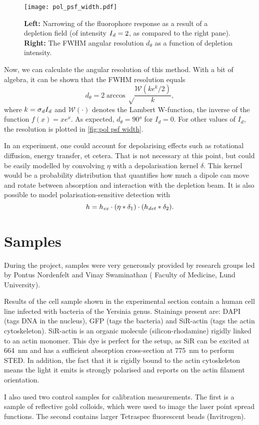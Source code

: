 \begin{figure}
	\centering
	\texttt{[image: pol\_psf\_width.pdf]}
	\caption{
		\textbf{Left:} Narrowing of the fluorophore response as a result of a depletion field (of intensity $ I_{\mathit{d}}=2 $, as compared to the right pane). \textbf{Right:} The FWHM angular resolution $ d_\theta $ as a function of depletion intensity.
	}
	\label{fig:pol psf width}
\end{figure}

Now, we can calculate the angular resolution of this method. With a bit of algebra, it can be shown that the FWHM resolution equals
\begin{equation}
	d_\theta = 2\arccos\sqrt\frac{\mathcal{W}(k e^{k}/2)}{k},
\end{equation}
where $ k = \sigma_{\mathit{d}} I_{\mathit{d}} $ and $ \mathcal{W}(\cdot) $ denotes the Lambert W-function, the inverse of the function $ f(x) = xe^x $. As expected, $ d_\theta=\ang{90} $ for $ I_d=0 $. For other values of $ I_d $, the resolution is plotted in \autoref{fig:pol psf width}.

In an experiment, one could account for depolarising effects such as rotational diffusion, energy transfer, et cetera. That is not necessary at this point, but could be easily modelled by convolving $ \eta $ with a depolarisation kernel $ \delta $. This kernel would be a probability distribution that quantifies how much a dipole can move and rotate between absorption and interaction with the depletion beam. It is also possible to model polarisation-sensitive detection with
\begin{equation}
	h = h_{\mathit{ex}} \cdot (\eta * \delta_1) \cdot (h_\mathit{det} * \delta_2).
\end{equation}

\section{Samples}
\label{sec:samples}

During the project, samples were very generously provided by research groups led by Pontus Nordenfelt and Vinay Swaminathan (%
Faculty of Medicine, Lund University).

Results of the cell sample shown in the experimental section contain a human cell line infected with bacteria of the Yersinia genus. Stainings present are: DAPI (tags DNA in the nucleus), GFP (tags the bacteria) and SiR-actin (tags the actin cytoskeleton). SiR-actin is an organic molecule (silicon-rhodamine) rigidly linked to an actin monomer. This dye is perfect for the setup, as SiR can be excited at 664~nm and has a sufficient absorption cross-section at 775~nm to perform STED. In addition, the fact that it is rigidly bound to the actin cytoskeleton means the light it emits is strongly polarised and reports on the actin filament orientation.

I also used two control samples for calibration measurements. The first is a sample of reflective gold colloids, which were used to image the laser point spread functions. The second contains larger Tetraspec fluorescent beads (Invitrogen).